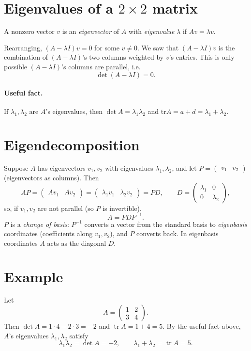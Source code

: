 \section{Eigenvalues of a $2\times 2$ matrix}

\begin{definition}
A nonzero vector $v$ is an \emph{eigenvector} of $A$ with
\emph{eigenvalue} $\lambda$ if $Av = \lambda v$.
\end{definition}

Rearranging, $(A-\lambda I)v = 0$ for some $v\ne 0$. We saw that
$(A-\lambda I)v$ is the combination of $(A-\lambda I)$'s two columns
weighted by $v$'s entries. This is only possible $(A-\lambda I)$'s
columns are parallel, i.e.
\[
\det(A-\lambda I) = 0.
\]

\paragraph{Useful fact.}
If $\lambda_1, \lambda_2$ are $A$'s eigenvalues, then $\det A=
\lambda_1 \lambda_2$ and $\text{tr} A = a+d = \lambda_1 + \lambda_2$.

\section{Eigendecomposition}
Suppose $A$ has eigenvectors $v_1,v_2$ with eigenvalues
$\lambda_1,\lambda_2$, and let $P=\begin{pmatrix}v_1 & v_2\end{pmatrix}$
(eigenvectors as columns). Then
\[
AP = \begin{pmatrix}Av_1 & Av_2\end{pmatrix}
   = \begin{pmatrix}\lambda_1 v_1 & \lambda_2 v_2\end{pmatrix}
   = PD, \qquad D=\begin{pmatrix}\lambda_1&0\\0&\lambda_2\end{pmatrix},
\]
so, if $v_1,v_2$ are not parallel (so $P$ is invertible),
\[
A = PDP^{-1}.
\]
$P$ is a \emph{change of basis}: $P^{-1}$ converts a vector from the
standard basis to \emph{eigenbasis} coordinates (coefficients along
$v_1,v_2$), and $P$ converts back. In eigenbasis coordinates $A$ acts
as the diagonal $D$.

\section{Example}
Let
\[
A = \begin{pmatrix}1&2\\3&4\end{pmatrix}.
\]
Then $\det A = 1\cdot 4 - 2\cdot 3 = -2$ and $\operatorname{tr}A =
1+4=5$. By the useful fact above, $A$'s eigenvalues $\lambda_1,\lambda_2$
satisfy
\[
\lambda_1\lambda_2 = \det A = -2, \qquad \lambda_1+\lambda_2 =
\operatorname{tr}A = 5.
\]

